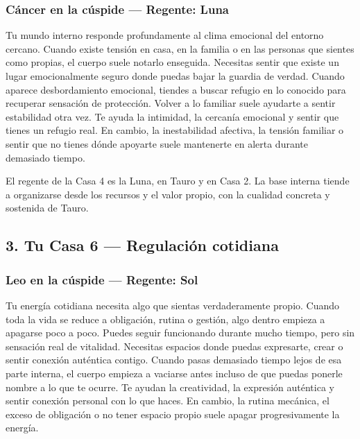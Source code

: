 \documentclass[11pt,a4paper]{article}
\begin{document}
\subsubsection*{Cáncer en la cúspide — Regente: Luna}

Tu mundo interno responde profundamente al clima emocional del entorno cercano. Cuando existe tensión en casa, en la familia o en las personas que sientes como propias, el cuerpo suele notarlo enseguida. Necesitas sentir que existe un lugar emocionalmente seguro donde puedas bajar la guardia de verdad. Cuando aparece desbordamiento emocional, tiendes a buscar refugio en lo conocido para recuperar sensación de protección. Volver a lo familiar suele ayudarte a sentir estabilidad otra vez. Te ayuda la intimidad, la cercanía emocional y sentir que tienes un refugio real. En cambio, la inestabilidad afectiva, la tensión familiar o sentir que no tienes dónde apoyarte suele mantenerte en alerta durante demasiado tiempo.

El regente de la Casa 4 es la Luna, en Tauro y en Casa 2. La base interna tiende a organizarse desde los recursos y el valor propio, con la cualidad concreta y sostenida de Tauro.

\vspace{0.8cm}

\subsection{3. Tu Casa 6 — Regulación cotidiana}

\subsubsection*{Leo en la cúspide — Regente: Sol}

Tu energía cotidiana necesita algo que sientas verdaderamente propio. Cuando toda la vida se reduce a obligación, rutina o gestión, algo dentro empieza a apagarse poco a poco. Puedes seguir funcionando durante mucho tiempo, pero sin sensación real de vitalidad. Necesitas espacios donde puedas expresarte, crear o sentir conexión auténtica contigo. Cuando pasas demasiado tiempo lejos de esa parte interna, el cuerpo empieza a vaciarse antes incluso de que puedas ponerle nombre a lo que te ocurre. Te ayudan la creatividad, la expresión auténtica y sentir conexión personal con lo que haces. En cambio, la rutina mecánica, el exceso de obligación o no tener espacio propio suele apagar progresivamente la energía.
\end{document}
